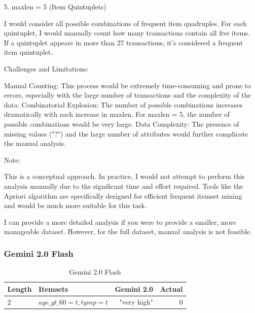 \documentclass[12pt]{article}
\begin{document}
\begin{mdframed}
5. maxlen = 5 (Item Quintuplets)
\newline

    I would consider all possible combinations of frequent item quadruples.
    For each quintuplet, I would manually count how many transactions contain all five items.
    If a quintuplet appears in more than 27 transactions, it's considered a frequent item quintuplet.
\newline

Challenges and Limitations:
\newline

    Manual Counting: This process would be extremely time-consuming and prone to errors, especially with the large number of transactions and the complexity of the data.
    Combinatorial Explosion: The number of possible combinations increases dramatically with each increase in maxlen. For maxlen = 5, the number of possible combinations would be very large.
    Data Complexity: The presence of missing values ("?") and the large number of attributes would further complicate the manual analysis.
\newline

Note:
\newline

    This is a conceptual approach. In practice, I would not attempt to perform this analysis manually due to the significant time and effort required.
    Tools like the Apriori algorithm are specifically designed for efficient frequent itemset mining and would be much more suitable for this task.
\newline

I can provide a more detailed analysis if you were to provide a smaller, more manageable dataset. However, for the full dataset, manual analysis is not feasible.
\end{mdframed}

\newpage

\subsubsection{Gemini 2.0 Flash}
\begin{table}[h]
    \centering
    \begin{tabular}{|l|l|r|r|}
    \hline
        Length & Itemsets & Gemini 2.0 & Actual\\
            \hline
        2 &  $age\_gt\_60=t, tymp=t$ & "very high" &\color{red}0 \\       
        \hline
    \end{tabular}
    \caption{Gemini 2.0 Flash}
    \label{tab:my_label}
\end{table}
\end{document}
